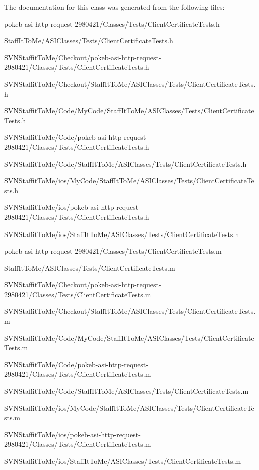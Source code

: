 \-The documentation for this class was generated from the following files\-:\begin{DoxyCompactItemize}
\item 
pokeb-\/asi-\/http-\/request-\/2980421/\-Classes/\-Tests/\-Client\-Certificate\-Tests.\-h\item 
\-Staff\-It\-To\-Me/\-A\-S\-I\-Classes/\-Tests/\-Client\-Certificate\-Tests.\-h\item 
\-S\-V\-N\-Staffit\-To\-Me/\-Checkout/pokeb-\/asi-\/http-\/request-\/2980421/\-Classes/\-Tests/\-Client\-Certificate\-Tests.\-h\item 
\-S\-V\-N\-Staffit\-To\-Me/\-Checkout/\-Staff\-It\-To\-Me/\-A\-S\-I\-Classes/\-Tests/\-Client\-Certificate\-Tests.\-h\item 
\-S\-V\-N\-Staffit\-To\-Me/\-Code/\-My\-Code/\-Staff\-It\-To\-Me/\-A\-S\-I\-Classes/\-Tests/\-Client\-Certificate\-Tests.\-h\item 
\-S\-V\-N\-Staffit\-To\-Me/\-Code/pokeb-\/asi-\/http-\/request-\/2980421/\-Classes/\-Tests/\-Client\-Certificate\-Tests.\-h\item 
\-S\-V\-N\-Staffit\-To\-Me/\-Code/\-Staff\-It\-To\-Me/\-A\-S\-I\-Classes/\-Tests/\-Client\-Certificate\-Tests.\-h\item 
\-S\-V\-N\-Staffit\-To\-Me/ios/\-My\-Code/\-Staff\-It\-To\-Me/\-A\-S\-I\-Classes/\-Tests/\-Client\-Certificate\-Tests.\-h\item 
\-S\-V\-N\-Staffit\-To\-Me/ios/pokeb-\/asi-\/http-\/request-\/2980421/\-Classes/\-Tests/\-Client\-Certificate\-Tests.\-h\item 
\-S\-V\-N\-Staffit\-To\-Me/ios/\-Staff\-It\-To\-Me/\-A\-S\-I\-Classes/\-Tests/\-Client\-Certificate\-Tests.\-h\item 
pokeb-\/asi-\/http-\/request-\/2980421/\-Classes/\-Tests/\-Client\-Certificate\-Tests.\-m\item 
\-Staff\-It\-To\-Me/\-A\-S\-I\-Classes/\-Tests/\-Client\-Certificate\-Tests.\-m\item 
\-S\-V\-N\-Staffit\-To\-Me/\-Checkout/pokeb-\/asi-\/http-\/request-\/2980421/\-Classes/\-Tests/\-Client\-Certificate\-Tests.\-m\item 
\-S\-V\-N\-Staffit\-To\-Me/\-Checkout/\-Staff\-It\-To\-Me/\-A\-S\-I\-Classes/\-Tests/\-Client\-Certificate\-Tests.\-m\item 
\-S\-V\-N\-Staffit\-To\-Me/\-Code/\-My\-Code/\-Staff\-It\-To\-Me/\-A\-S\-I\-Classes/\-Tests/\-Client\-Certificate\-Tests.\-m\item 
\-S\-V\-N\-Staffit\-To\-Me/\-Code/pokeb-\/asi-\/http-\/request-\/2980421/\-Classes/\-Tests/\-Client\-Certificate\-Tests.\-m\item 
\-S\-V\-N\-Staffit\-To\-Me/\-Code/\-Staff\-It\-To\-Me/\-A\-S\-I\-Classes/\-Tests/\-Client\-Certificate\-Tests.\-m\item 
\-S\-V\-N\-Staffit\-To\-Me/ios/\-My\-Code/\-Staff\-It\-To\-Me/\-A\-S\-I\-Classes/\-Tests/\-Client\-Certificate\-Tests.\-m\item 
\-S\-V\-N\-Staffit\-To\-Me/ios/pokeb-\/asi-\/http-\/request-\/2980421/\-Classes/\-Tests/\-Client\-Certificate\-Tests.\-m\item 
\-S\-V\-N\-Staffit\-To\-Me/ios/\-Staff\-It\-To\-Me/\-A\-S\-I\-Classes/\-Tests/\-Client\-Certificate\-Tests.\-m\end{DoxyCompactItemize}
